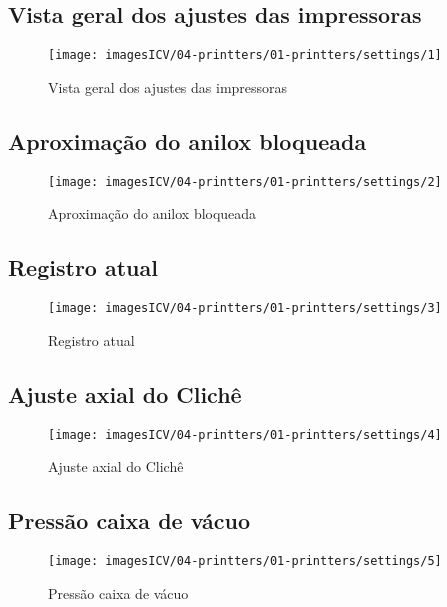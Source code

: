 \usepackage{graphicx}
\newpage
\thispagestyle{fancy}
\vspace{\fill}

\subsection{Vista geral dos ajustes das impressoras}
\begin{figure}
    \centering
    \texttt{[image: imagesICV/04-printters/01-printters/settings/1]}
    \caption{Vista geral dos ajustes das impressoras}
\end{figure}
\newpage
\thispagestyle{fancy}
\vspace{\fill}

\subsection{Aproximação do anilox bloqueada}
\begin{figure}
    \centering
    \texttt{[image: imagesICV/04-printters/01-printters/settings/2]}
    \caption{Aproximação do anilox bloqueada}
\end{figure}
\newpage
\thispagestyle{fancy}
\vspace{\fill}

\subsection{Registro atual}
\begin{figure}
    \centering
    \texttt{[image: imagesICV/04-printters/01-printters/settings/3]}
    \caption{Registro atual}
\end{figure}
\newpage
\thispagestyle{fancy}
\vspace{\fill}

\subsection{Ajuste axial do Clichê}
\begin{figure}
    \centering
    \texttt{[image: imagesICV/04-printters/01-printters/settings/4]}
    \caption{Ajuste axial do Clichê}
\end{figure}
\newpage
\thispagestyle{fancy}
\vspace{\fill}

\subsection{Pressão caixa de vácuo}
\begin{figure}
    \centering
    \texttt{[image: imagesICV/04-printters/01-printters/settings/5]}
    \caption{Pressão caixa de vácuo}
\end{figure}
\newpage
\thispagestyle{fancy}
\vspace{\fill}

